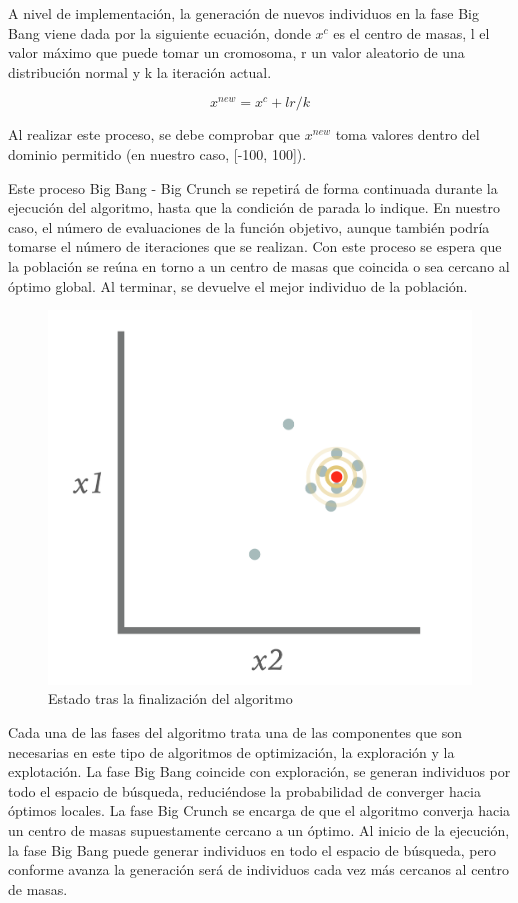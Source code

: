 A nivel de implementación, la generación de nuevos individuos en la fase Big Bang viene dada por la siguiente ecuación, donde $x^c$ es el centro de masas, l el valor máximo que puede tomar un cromosoma, r un valor aleatorio de una distribución normal y k la iteración actual.

\begin{equation}
    x^{new} = x^c + lr/k
\end{equation}

Al realizar este proceso, se debe comprobar que \noindent $x^{new}$ toma valores dentro del dominio permitido (en nuestro caso, [-100, 100]). 

Este proceso Big Bang - Big Crunch se repetirá de forma continuada durante la ejecución del algoritmo, hasta que la condición de parada lo indique. En nuestro caso, el número de evaluaciones de la función objetivo, aunque también podría tomarse el número de iteraciones que se realizan. Con este proceso se espera que la población se reúna en torno a un centro de masas que coincida o sea cercano al óptimo global. Al terminar, se devuelve el mejor individuo de la población. 

\begin{figure}[H]
\centering
    \includegraphics[scale=0.23]{img/end.png}
    \caption{Estado tras la finalización del algoritmo}
\end{figure}

Cada una de las fases del algoritmo trata una de las componentes que son necesarias en este tipo de algoritmos de optimización, la exploración y la explotación. La fase Big Bang coincide con exploración, se generan individuos por todo el espacio de búsqueda, reduciéndose la probabilidad de converger hacia óptimos locales. La fase Big Crunch se encarga de que el algoritmo converja hacia un centro de masas supuestamente cercano a un óptimo. Al inicio de la ejecución, la fase Big Bang puede generar individuos en todo el espacio de búsqueda, pero conforme avanza la generación será de individuos cada vez más cercanos al centro de masas. 

